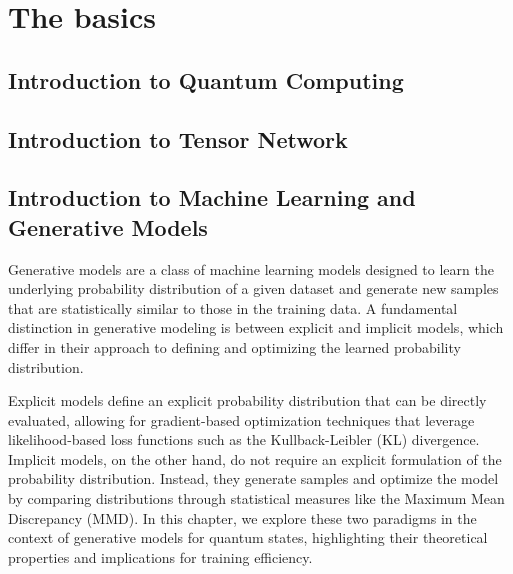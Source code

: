\chapter{The basics}

\section{Introduction to Quantum Computing}

\lipsum[1-2] 
\cite{rudolph_generation_2022}
\cite{schollwock_density-matrix_2011}
\cite{mangini_low-variance_2024}
\cite{rudolph_trainability_2024}
\cite{collura_tensor_2024}
\cite{garcia-perez_learning_2021}

\section{Introduction to Tensor Network}

\lipsum[1-2]

\section{Introduction to Machine Learning and Generative Models}

Generative models are a class of machine learning models designed to learn the underlying probability distribution of a given dataset and generate new samples that are statistically similar to those in the training data. A fundamental distinction in generative modeling is between explicit and implicit models, which differ in their approach to defining and optimizing the learned probability distribution.

Explicit models define an explicit probability distribution that can be directly evaluated, allowing for gradient-based optimization techniques that leverage likelihood-based loss functions such as the Kullback-Leibler (KL) divergence. Implicit models, on the other hand, do not require an explicit formulation of the probability distribution. Instead, they generate samples and optimize the model by comparing distributions through statistical measures like the Maximum Mean Discrepancy (MMD). In this chapter, we explore these two paradigms in the context of generative models for quantum states, highlighting their theoretical properties and implications for training efficiency.
